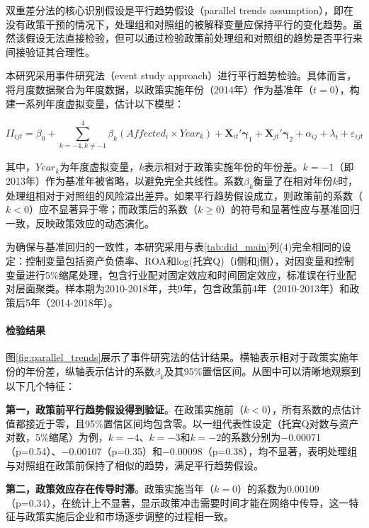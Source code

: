 双重差分法的核心识别假设是平行趋势假设（parallel trends assumption），即在没有政策干预的情况下，处理组和对照组的被解释变量应保持平行的变化趋势\citep{angrist2009mostly}。虽然该假设无法直接检验，但可以通过检验政策前处理组和对照组的趋势是否平行来间接验证其合理性。

本研究采用事件研究法（event study approach）进行平行趋势检验。具体而言，将月度数据聚合为年度数据，以政策实施年份（2014年）作为基准年（$t=0$），构建一系列年度虚拟变量，估计以下模型：

\begin{equation}
\label{eq:event_study}
II_{ijt} = \beta_0 + \sum_{k=-4, k \neq -1}^{4} \beta_k (Affected_i \times Year_k) + \bm{X}_{it}'\bm{\gamma}_1 + \bm{X}_{jt}'\bm{\gamma}_2 + \alpha_{ij} + \lambda_t + \varepsilon_{ijt}
\end{equation}

其中，$Year_k$为年度虚拟变量，$k$表示相对于政策实施年份的年份差。$k=-1$（即2013年）作为基准年被省略，以避免完全共线性。系数$\beta_k$衡量了在相对年份$k$时，处理组相对于对照组的风险溢出差异。如果平行趋势假设成立，则政策前的系数（$k<0$）应不显著异于零；而政策后的系数（$k \geq 0$）的符号和显著性应与基准回归一致，反映政策效应的动态演化。

为确保与基准回归的一致性，本研究采用与表\ref{tab:did_main}列(4)完全相同的设定：控制变量包括资产负债率、ROA和log(托宾Q)（i侧和j侧），对因变量和控制变量进行5\%缩尾处理，包含行业配对固定效应和时间固定效应，标准误在行业配对层面聚类。样本期为2010-2018年，共9年，包含政策前4年（2010-2013年）和政策后5年（2014-2018年）。

\paragraph{检验结果}

图\ref{fig:parallel_trends}展示了事件研究法的估计结果。横轴表示相对于政策实施年份的年份差，纵轴表示估计的系数$\beta_k$及其95\%置信区间。从图中可以清晰地观察到以下几个特征：

\textbf{第一，政策前平行趋势假设得到验证}。在政策实施前（$k<0$），所有系数的点估计值都接近于零，且95\%置信区间均包含零。以一组代表性设定（托宾Q对数与资产对数，5\%缩尾）为例，$k=-4$、$k=-3$和$k=-2$的系数分别为$-$0.00071（p=0.54）、$-$0.00107（p=0.35）和$-$0.00098（p=0.38），均不显著，表明处理组与对照组在政策前保持了相似的趋势，满足平行趋势假设。

\textbf{第二，政策效应存在传导时滞}。政策实施当年（$k=0$）的系数为0.00109（p=0.34），在统计上不显著，显示政策冲击需要时间才能在网络中传导，这一特征与政策实施后企业和市场逐步调整的过程相一致。

